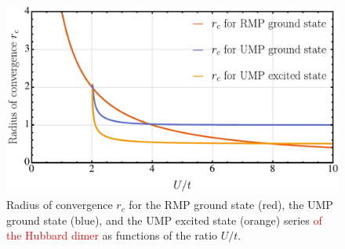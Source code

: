 \documentclass[aps,prb,reprint,noshowkeys,superscriptaddress]{revtex4-1}
\newcommand{\titou}[1]{\textcolor{red}{#1}}
\begin{document}
\begin{figure}[htb]
	\includegraphics[width=\linewidth]{fig5}
	\caption{
	Radius of convergence $r_c$ for the RMP ground state (red), the UMP ground state (blue), and the UMP excited state (orange) 
    series \titou{of the Hubbard dimer} as functions of the ratio $U/t$.
	\label{fig:RadConv}}
\end{figure}
\end{document}
